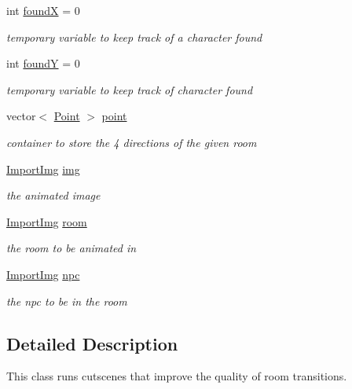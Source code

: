 \begin{DoxyCompactItemize}
int \hyperlink{classCutscene_a829a69db5263fd8e0915a9b905c386d0}{found\-X} = 0
\begin{DoxyCompactList}\small\item\em temporary variable to keep track of a character found \end{DoxyCompactList}\item 
int \hyperlink{classCutscene_ac77c836201afb1a31547c6c930e323d4}{found\-Y} = 0
\begin{DoxyCompactList}\small\item\em temporary variable to keep track of character found \end{DoxyCompactList}\item 
vector$<$ \hyperlink{structCutscene_1_1Point}{Point} $>$ \hyperlink{classCutscene_a7438465af0e7bc51d52ca5aaefc97e3b}{point}
\begin{DoxyCompactList}\small\item\em container to store the 4 directions of the given room \end{DoxyCompactList}\item 
\hyperlink{classImportImg}{Import\-Img} \hyperlink{classCutscene_ae40582568add2f44e099d4a8978f41d4}{img}
\begin{DoxyCompactList}\small\item\em the animated image \end{DoxyCompactList}\item 
\hyperlink{classImportImg}{Import\-Img} \hyperlink{classCutscene_a033c0715f32be9730d3692e57fe17096}{room}
\begin{DoxyCompactList}\small\item\em the room to be animated in \end{DoxyCompactList}\item 
\hyperlink{classImportImg}{Import\-Img} \hyperlink{classCutscene_a85778dff65358df7ddf7a77edeae9b7a}{npc}
\begin{DoxyCompactList}\small\item\em the npc to be in the room \end{DoxyCompactList}\end{DoxyCompactItemize}


\subsection{Detailed Description}
This class runs cutscenes that improve the quality of room transitions. 

